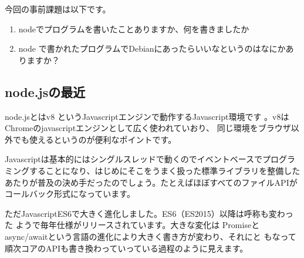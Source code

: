 \documentclass[mingoth,a4paper]{jsarticle}
\begin{document}

今回の事前課題は以下です。

\begin{enumerate}
 \item nodeでプログラムを書いたことありますか、何を書きましたか
 \item node で書かれたプログラムでDebianにあったらいいなというのはなにかありますか？
\end{enumerate}


\begin{multicols}{2}
{\small
% 
}
\end{multicols}

%
%
%
%




\subsection{node.jsの最近}

node.jsとはv8 というJavascriptエンジンで動作するJavascript環境です
\cite{nodejsorg}。v8はChromeのjavascriptエンジンとして広く使われていおり、
同じ環境をブラウザ以外でも使えるというのが便利なポイントです。

Javascriptは基本的にはシングルスレッドで動くのでイベントベースでプログラ
ミングすることになり、はじめにそこをうまく扱った標準ライブラリを整備した
あたりが普及の決め手だったのでしょう。たとえばほぼすべてのファイルAPIが
コールバック形式になっています。

ただJavascriptES6で大きく進化しました。ES6（ES2015）以降は呼称も変わった
ようで毎年仕様がリリースされています\cite{nodejs-es6}。大きな変化は
Promiseとasync/awaitという言語の進化により大きく書き方が変わり、それにと
もなって順次コアのAPIも書き換わっていっている過程のように見えます。
\end{document}

